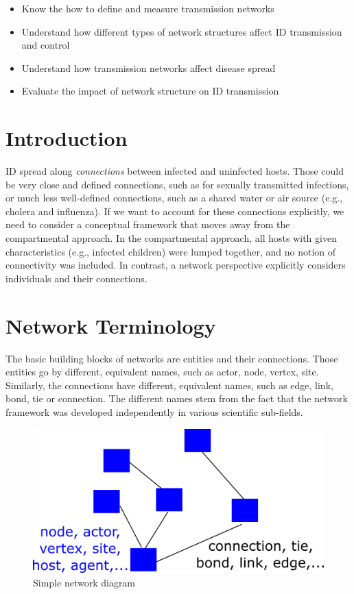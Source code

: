 \documentclass[]{book}
\providecommand{\tightlist}{%
  \setlength{\itemsep}{0pt}\setlength{\parskip}{0pt}}
\theoremstyle{definition}
\theoremstyle{definition}
\theoremstyle{definition}
\theoremstyle{remark}
\begin{document}
\begin{itemize}
\tightlist
\item
  Know the how to define and measure transmission networks
\item
  Understand how different types of network structures affect ID
  transmission and control
\item
  Understand how transmission networks affect disease spread
\item
  Evaluate the impact of network structure on ID transmission
\end{itemize}

\section{Introduction}\label{introduction-14}

ID spread along \emph{connections} between infected and uninfected
hosts. Those could be very close and defined connections, such as for
sexually transmitted infections, or much less well-defined connections,
such as a shared water or air source (e.g., cholera and influenza). If
we want to account for these connections explicitly, we need to consider
a conceptual framework that moves away from the compartmental approach.
In the compartmental approach, all hosts with given characteristics
(e.g., infected children) were lumped together, and no notion of
connectivity was included. In contrast, a network perspective explicitly
considers individuals and their connections.

\section{Network Terminology}\label{network-terminology}

The basic building blocks of networks are entities and their
connections. Those entities go by different, equivalent names, such as
actor, node, vertex, site. Similarly, the connections have different,
equivalent names, such as edge, link, bond, tie or connection. The
different names stem from the fact that the network framework was
developed independently in various scientific sub-fields.

\begin{figure}
\centering
\includegraphics{./images/network-diagram.png}
\caption{Simple network diagram}
\end{figure}
\end{document}
